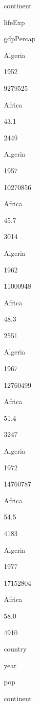 \documentclass[]{book}
\newenvironment{Shaded}{\begin{snugshade}}{\end{snugshade}}
\newcommand{\KeywordTok}[1]{\textcolor[rgb]{0.13,0.29,0.53}{\textbf{#1}}}
\newcommand{\StringTok}[1]{\textcolor[rgb]{0.31,0.60,0.02}{#1}}
\newcommand{\CommentTok}[1]{\textcolor[rgb]{0.56,0.35,0.01}{\textit{#1}}}
\newcommand{\OperatorTok}[1]{\textcolor[rgb]{0.81,0.36,0.00}{\textbf{#1}}}
\newcommand{\NormalTok}[1]{#1}
\begin{document}
continent

lifeExp

gdpPercap

Algeria

1952

9279525

Africa

43.1

2449

Algeria

1957

10270856

Africa

45.7

3014

Algeria

1962

11000948

Africa

48.3

2551

Algeria

1967

12760499

Africa

51.4

3247

Algeria

1972

14760787

Africa

54.5

4183

Algeria

1977

17152804

Africa

58.0

4910

\begin{Shaded}
\end{Shaded}

country

year

pop

continent
\end{document}
